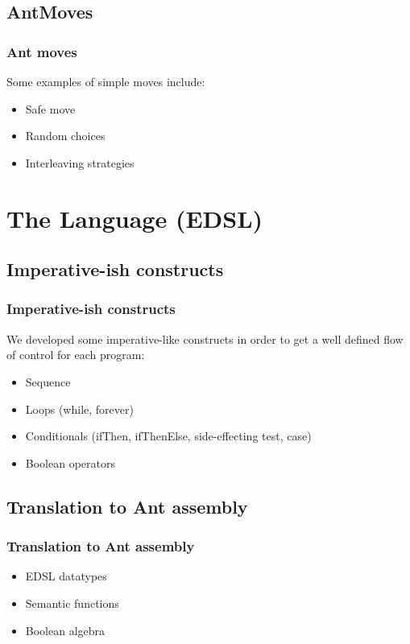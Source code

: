 \documentclass{beamer}
\begin{document}
        \subsection{AntMoves}
        \begin{frame}
        \frametitle{Ant moves}
            Some examples of simple moves include:
            \begin{itemize}
                \item Safe move
                \item Random choices
                \item Interleaving strategies
            \end{itemize}
        \end{frame}


    \section{The Language (EDSL)}
        \subsection{Imperative-ish constructs}
        \begin{frame}
            \frametitle{Imperative-ish constructs}
            We developed some imperative-like constructs in order to get a well
            defined flow of control for each program:

            \begin{itemize}
                \item Sequence
                \item Loops (while, forever)
                \item Conditionals (ifThen, ifThenElse, side-effecting test, case)
                \item Boolean operators
            \end{itemize}
        \end{frame}

        \subsection{Translation to Ant assembly}
        \begin{frame}
            \frametitle{Translation to Ant assembly}

            \begin{itemize}
                \item EDSL datatypes
                \item Semantic functions
                \item Boolean algebra
            \end{itemize}
        \end{frame}
\end{document}
